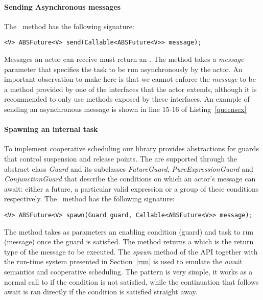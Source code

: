 \paragraph{Sending Asynchronous messages}
 The \send  ~method has the following signature:
\begin{lstlisting}
<V> ABSFuture<V> send(Callable<ABSFuture<V>> message);
\end{lstlisting}
Messages an actor can receive must return an \future. The method takes a \textit{message} parameter that specifies the task to be run asynchronously by the actor. An important observation to make here is that we cannot enforce the \textit{message} to be a method provided by one of the interfaces that the actor extends, although it is recommended to only use methods exposed by these interfaces. An example of sending an asynchronous message is shown in line 15-16 of Listing~\ref{queensex}



\paragraph{Spawning an internal task}
To implement cooperative scheduling our library provides abstractions for guards that control suspension and release points. The are supported through the abstract class \textit{Guard} and its subclasses \textit{FutureGuard}, \textit{PureExpressionGuard} and \textit{ConjunctionGuard} that describe the conditions on which an actor's message can await: either a future, a particular valid expression or a group of these conditions respectively. The \spawn ~method has the following signature:

\begin{lstlisting}
<V> ABSFuture<V> spawn(Guard guard, Callable<ABSFuture<V>> message);
\end{lstlisting}

 The method takes as parameters an enabling condition (guard) and task to run (message) once the guard is satisfied. The method returns a \future which is the return type of the message to be executed. The \textit{spawn} method of the API together with the run-time system presented in Section~\ref{run} is used to emulate the \textit{await} semantics and cooperative scheduling. 
The pattern is very simple, it works as a normal call to \spawn if the condition is not satisfied, while the continuation that follows await is ran directly if the condition is satisfied straight away.


